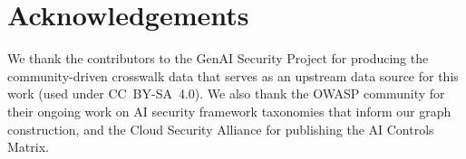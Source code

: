 \section*{Acknowledgements}

We thank the contributors to the GenAI Security Project for producing
the community-driven crosswalk data that serves as an upstream data
source for this work (used under CC~BY-SA~4.0). We also thank the OWASP
community for their ongoing work on AI security framework taxonomies
that inform our graph construction, and the Cloud Security Alliance for
publishing the AI Controls Matrix.
